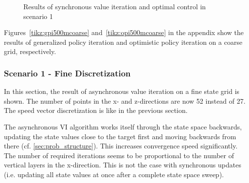 \begin{figure}[hbt]
	\caption{Results of synchronous value iteration and optimal control in scenario 1}
	\label{tikz:vi500mcoarse}
\end{figure}

Figures~\ref{tikz:gpi500mcoarse} and~\ref{tikz:opi500mcoarse} in the appendix show the results of generalized policy iteration and optimistic policy iteration on a coarse grid, respectively.

\subsubsection{Scenario 1 - Fine Discretization}

In this section, the result of asynchronous value iteration on a fine state grid is shown. The number of points in the x- and z-directions are now 52 instead of 27. The speed vector discretization is like in the previous section.

The asynchronous VI algorithm works itself through the state space backwards, updating the state values close to the target first and moving backwards from there (cf. \ref{sec:prob_structure}). This increases convergence speed significantly. The number of required iterations seems to be proportional to the number of vertical layers in the x-direction. This is not the case with synchronous updates (i.e. updating all state values at once after a complete state space sweep). 

